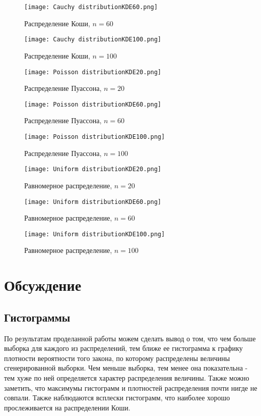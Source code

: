 \documentclass[a4paper]{article}
\begin{document}
\begin{figure}[H]
	{\texttt{[image: Cauchy distributionKDE60.png]}}
		\caption{Распределение Коши, $n=60$} 
		\label{fig:normal}
	\end{figure}
	
\begin{figure}[H]
	{\texttt{[image: Cauchy distributionKDE100.png]}}
		\caption{Распределение Коши, $n=100$} 
		\label{fig:normal}
	\end{figure}

\begin{figure}[H]
	{\texttt{[image: Poisson distributionKDE20.png]}}
		\caption{Распределение Пуассона, $n=20$} 
		\label{fig:normal}
	\end{figure}
	
\begin{figure}[H]
	{\texttt{[image: Poisson distributionKDE60.png]}}
		\caption{Распределение Пуассона, $n=60$} 
		\label{fig:normal}
	\end{figure}
	
\begin{figure}[H]
	{\texttt{[image: Poisson distributionKDE100.png]}}
		\caption{Распределение Пуассона, $n=100$} 
		\label{fig:normal}
	\end{figure}
	
\begin{figure}[H]
	{\texttt{[image: Uniform distributionKDE20.png]}}
		\caption{Равномерное распределение, $n=20$} 
		\label{fig:normal}
	\end{figure}
	
\begin{figure}[H]
	{\texttt{[image: Uniform distributionKDE60.png]}}
		\caption{Равномерное распределение, $n=60$} 
		\label{fig:normal}
	\end{figure}

\begin{figure}[H]
	{\texttt{[image: Uniform distributionKDE100.png]}}
		\caption{Равномерное распределение, $n=100$} 
		\label{fig:normal}
	\end{figure}
	
\section{Обсуждение}
\subsection{Гистограммы}
\noindent По результатам проделанной работы можем сделать вывод о том, что чем больше выборка для каждого из распределений, тем ближе ее гистограмма к графику плотности вероятности того закона, по которому распределены величины сгенерированной выборки. Чем меньше выборка, тем менее она показательна - тем хуже по ней определяется характер распределения величины. \newline Также можно заметить, что максимумы гистограмм и плотностей распределения почти нигде не совпали. Также наблюдаются всплески гистограмм,
что наиболее хорошо прослеживается на распределении Коши.
\end{document}
